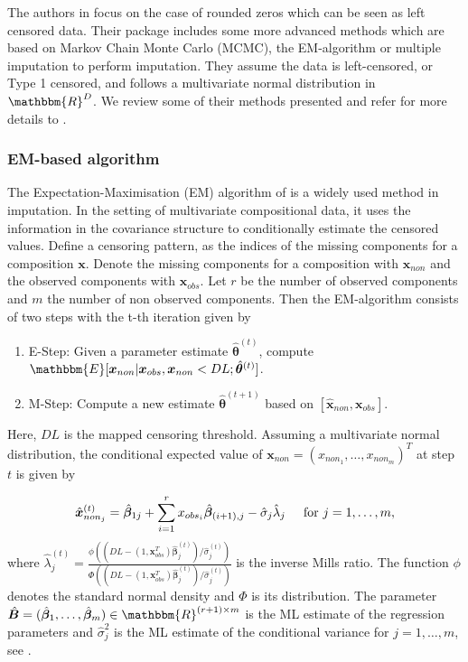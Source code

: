 The authors in \textcite{Palarea-Albaladejo:2015} focus on the case of rounded zeros which can be seen as left censored data. Their package includes some more advanced methods which are based on Markov Chain Monte Carlo (MCMC), the EM-algorithm or multiple imputation to perform imputation. They assume the data is left-censored, or Type 1 censored, and follows a multivariate normal distribution in $\mathbbm{R}^D$. We review some of their methods presented and refer for more details to \textcite{Palarea-Albaladejo:2015}.

\subsubsection{EM-based algorithm}
\label{sec:EM-algorithm}

The Expectation-Maximisation (EM) algorithm of \textcite{Dempster:1977} is a widely used method in imputation. In the setting of multivariate compositional data, it uses the information in the covariance structure to conditionally estimate the censored values. Define a censoring pattern, as the indices of the missing components for a composition $\bm{x}$. Denote the missing components for a composition with $\bm{x}_{non}$ and the observed components with $\bm{x}_{obs}$. Let $r$ be the number of observed components and $m$ the number of non observed components. Then the EM-algorithm consists of two steps with the t-th iteration given by

\begin{enumerate}
	\item E-Step: Given a parameter estimate $\hat{\bm{\theta}}^{(t)}$, compute $\mathbbm{E}[\bm{x}_{non}|\bm{x}_{obs},\bm{x}_{non} < DL; \hat{\bm{\theta}}^{(t)}]$.
	\item M-Step: Compute a new estimate $\hat{\bm{\theta}}^{(t+1)}$ based on $[\hat{\bm{x}}_{non},\bm{x}_{obs}]$.
\end{enumerate}
%
Here, $DL$ is the mapped censoring threshold. Assuming a multivariate normal distribution, the conditional expected value of $\bm{x}_{non}=(x_{{non}_1},\ldots,x_{{non}_{m}})^T$ at step $t$ is given by

\begin{equation}
\hat{\bm{x}}_{non_j}^{(t)} = \hat{\bm{\beta}}_{1j} + \sum_{i=1}^{r} x_{obs_{i}}\hat{\bm{\beta}}_{(i+1),j} - \hat{\sigma}_{j}\hat{\lambda}_{j} \hspace{0.5cm} \text{for } j=1,\ldots,m,
\label{eq:E-step}
\end{equation}
%
where $\hat{\lambda}_j^{(t)}=\frac{\phi((DL-(1,\bm{x}_{obs}^T)\hat{\bm{\beta}}_{j}^{(t)})/\hat{\sigma}_j^{(t)})}{\Phi((DL-(1,\bm{x}_{obs}^T)\hat{\bm{\beta}}_{j}^{(t)})/\hat{\sigma}_j^{(t)})}$ is the inverse Mills ratio. The function $\phi$ denotes the standard normal density and $\Phi$ is its distribution. The parameter $\hat{\bm{B}} = (\hat{\bm{\beta}}_1,\ldots,\hat{\bm{\beta}}_m) \in \mathbbm{R}^{(r+1) \times m}$ is the ML estimate of the regression parameters and $\hat{\sigma}_j^2$ is the ML estimate of the conditional variance for $j=1,\ldots,m$, see \textcite{Palarea-Albaladejo:2015}. %

